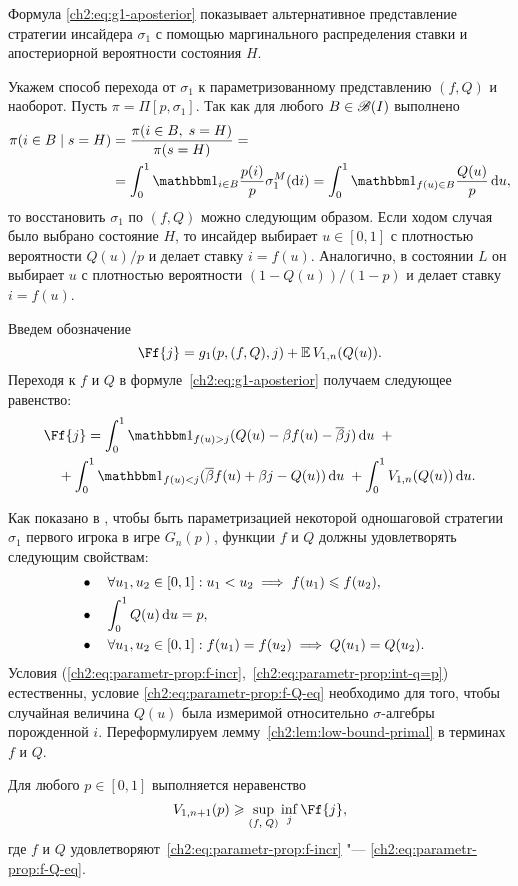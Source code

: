 {Формула \eqref{ch2:eq:g1-aposterior} показывает альтернативное представление стратегии инсайдера $\sigma_1$ с помощью маргинального распределения ставки и апостериорной вероятности состояния $H$.

Укажем способ перехода от $\sigma_1$ к параметризованному представлению $(f, Q)$ и наоборот.
Пусть $\pi = \Pi[p, \sigma_1]$.
Так как для любого $B \in \mathscr{B}(I)$ выполнено
\begin{align*}
  \pi(i \in B \; | \; s = H) 
  &= \frac{\pi(i \in B, \; s = H)}{\pi(s = H)} = \\
  &= \int_0^1 \Ind{i \in B} \frac{p(i)}{p} \sigma^M_1(\di i) =
  \int_0^1 \Ind{f(u) \in B} \frac{Q(u)}{p} \di u,
\end{align*}
то восстановить $\sigma_1$ по $(f, Q)$ можно следующим образом.
Если ходом случая было выбрано состояние $H$, то инсайдер выбирает $u \in [0, 1]$ с плотностью вероятности $Q(u)/p$ и делает ставку $i = f(u)$.
Аналогично, в состоянии $L$ он выбирает $u$ с плотностью вероятности $(1 - Q(u))/(1 - p)$ и делает ставку $i = f(u)$.

Введем обозначение
\[
  \Ff{j} = g_1(p, (f, Q), j) + \E V_{1,n}(Q(u)).
\]
Переходя к $f$ и $Q$ в формуле~\eqref{ch2:eq:g1-aposterior} получаем следующее равенство:
\begin{equation}\label{ch2:eq:F(f,Q,p)}
\begin{multlined}
  \Ff{j} =
  \int_0^1 \Ind{f(u) > j} (Q(u) - \Co f(u) - \DCo j) \di u \enskip + \\
  + \int_0^1 \Ind{f(u) < j} (\DCo f(u) + \Co j - Q(u)) \di u \; + \int_0^1
  V_{1,n}(Q(u)) \di u.
\end{multlined}
\end{equation}

Как показано в \cite{demeyer02}, чтобы быть параметризацией некоторой одношаговой стратегии $\sigma_1$ первого игрока в игре $G_n(p)$, функции $f$ и $Q$ должны удовлетворять следующим свойствам:
\begin{subequations}
  \begin{flalign}
    \label{ch2:eq:parametr-prop:f-incr}
    &\bullet\quad \forall u_1, u_2 \in [0, 1]: u_1 < u_2 \implies f(u_1) \leqslant f(u_2),&\\
    \label{ch2:eq:parametr-prop:int-q=p}
    &\bullet\quad \int_0^1 Q(u) \mathop{}\!\mathrm{d} u = p,&\\
    \label{ch2:eq:parametr-prop:f-Q-eq}
    &\bullet\quad \forall u_1, u_2 \in [0, 1]: f(u_1) = f(u_2) \implies Q(u_1) = Q(u_2).&
  \end{flalign}
\end{subequations}
Условия (\ref{ch2:eq:parametr-prop:f-incr},~\ref{ch2:eq:parametr-prop:int-q=p}) естественны, условие \eqref{ch2:eq:parametr-prop:f-Q-eq} необходимо для того, чтобы случайная величина $Q(u)$ была измеримой относительно $\sigma$-алгебры порожденной $i$.
Переформулируем лемму~\ref{ch2:lem:low-bound-primal} в терминах $f$ и $Q$.
\begin{lemma}
  Для любого $p \in [0, 1]$ выполняется неравенство
  \[
    V_{1,n+1}(p) \geqslant \sup_{(f, \; Q)} \inf_{j} \Ff{j},
  \]
  где $f$ и $Q$ удовлетворяют~\eqref{ch2:eq:parametr-prop:f-incr} "--- \eqref{ch2:eq:parametr-prop:f-Q-eq}.
\end{lemma}

}
